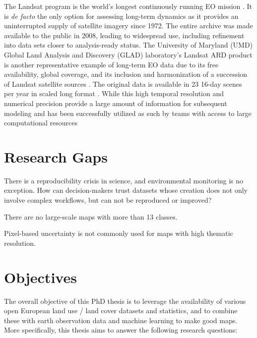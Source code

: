     The Landsat program is the world's longest continuously running EO mission \citep{wulder2022fifty}. It is \emph{de facto} the only option for assessing long-term dynamics as it provides an uninterrupted supply of satellite imagery since 1972. The entire archive was made available to the public in 2008, leading to widespread use, including refinement into data sets closer to analysis-ready status. The University of Maryland (UMD) Global Land Analysis and Discovery (GLAD) laboratory's Landsat ARD product is another representative example of long-term EO data due to its free availability, global coverage, and its inclusion and harmonization of a succession of Landsat satellite sources \citep{potapov2020landsat}. The original data is available in 23{\texttimes} 16-day scenes per year in scaled long format \citep{potapov2020landsat}. While this high temporal resolution and numerical precision provide a large amount of information for subsequent modeling and has been successfully utilized as such by teams with access to large computational resources \citep{hansen2022global}
    

    
    
    


\section{Research Gaps}

There is a reproducibility crisis in science, and environmental monitoring is no exception. How can decision-makers trust datasets whose creation does not only involve complex workflows, but can not be reproduced or improved?

There are no large-scale maps with more than 13 classes.

Pixel-based uncertainty is not commonly used for maps with high thematic resolution.





\section{Objectives}

The overall objective of this PhD thesis is to leverage the availability of various open European land use / land cover datasets and statistics, and to combine these with earth observation data and machine learning to make good maps. More specifically, this thesis aims to answer the following research questions:

